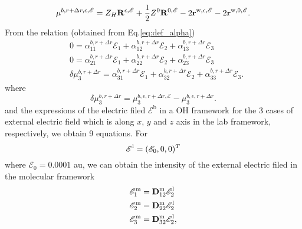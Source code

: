 \begin{equation}
  \mu^{b,r+\Delta r,\epsilon,\mathscr{E}} = Z_H{\bf R}^{\epsilon,\mathscr{E}} + 
  \frac{1}{2}Z^0 {\bf R}^{0,\mathscr{E}} -2 {\bf r}^{\text{w},\epsilon,\mathscr{E}} -2{\bf r}^{\text{w},0,\mathscr{E}}.
\end{equation}
From the relation (obtained from Eq.\thinspace\ref{eq:def_alpha})
      \begin{subequations}
          \begin{align}
            & 0 = \alpha^{b,r+\Delta r}_{11}\mathscr{E}_{1} + \alpha^{b,r+\Delta r}_{12}\mathscr{E}_{2} + \alpha^{b,r+\Delta r}_{13}\mathscr{E}_{3}\\
            & 0 = \alpha^{b,r+\Delta r}_{21}\mathscr{E}_{1} + \alpha^{b,r+\Delta r}_{22}\mathscr{E}_{2} + \alpha^{b,r+\Delta r}_{23}\mathscr{E}_{3}\\
            & \delta \mu^{b,r+\Delta r}_{3} = \alpha^{b,r+\Delta r}_{31}\mathscr{E}_{1} + \alpha^{b,r+\Delta r}_{32}\mathscr{E}_{2} + \alpha^{b,r+\Delta r}_{33}\mathscr{E}_{3}.
          \end{align}
      \end{subequations}
%
where
\begin{equation}
  \delta \mu^{b,r+\Delta r}_{3} = \mu^{b,\epsilon,r+\Delta r,\mathscr{E}}_{3} - \mu^{b,\epsilon,r+\Delta r}_{3}.
\end{equation}
%
and the expressions of the electric filed ${\mathscr{E}^\text{b}}$ in a OH framework for the 3 cases of external electric field 
which is along $x$, $y$ and $z$ axis in the lab framework, respectively, we obtain 9 equations.
%
For
\begin{equation}
  {\bf\mathscr{E}}^{\text{l}} = (\mathscr{E}_0, 0,0)^T \nonumber
\end{equation}  
where $\mathscr{E}_0 = 0.0001$ au, we can obtain the intensity of the external electric filed in the molecular framework  
\begin{subequations}
  \begin{align}
    &\mathscr{E}^\text{m}_1 = {\bf D}^{\text{m}}_{12} \mathscr{E}^\text{l}_2\\
    &\mathscr{E}^\text{m}_2 = {\bf D}^{\text{m}}_{22} \mathscr{E}^\text{l}_2\\
    &\mathscr{E}^\text{m}_3 = {\bf D}^{\text{m}}_{32} \mathscr{E}^\text{l}_2,
    \end{align}
\end{subequations}
